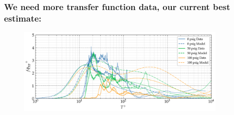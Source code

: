 \documentclass[aspectratio=169,9pt]{beamer}
\begin{document}
\begin{frame}
  \frametitle{We need more transfer function data, our current best estimate:}
  \begin{figure}
      \centering
      \includegraphics[width=0.9\textwidth]{final/spectra_comparison_tf.png}
  \end{figure}
\end{frame}
\end{document}
